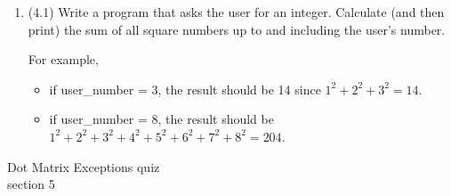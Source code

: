 \documentclass{article}
\begin{document}
\begin{enumerate}








\item (4.1)  
		Write a program that asks the user for an integer.  Calculate (and then print) the 
		sum of all square numbers up to and including the user's number.

		For example, 
		\begin{itemize}
			\item if user\_number = 3, the result should be 14 since $1^2 + 2^2 + 3^2 = 14$.
			\item if user\_number = 8, the result should be $1^2+2^2+3^2+4^2+5^2+6^2+7^2+8^2=204$.
		\end{itemize}


\end{enumerate}
\pagebreak
Dot Matrix \hfill Exceptions quiz\\
section 5\\
\end{document}
